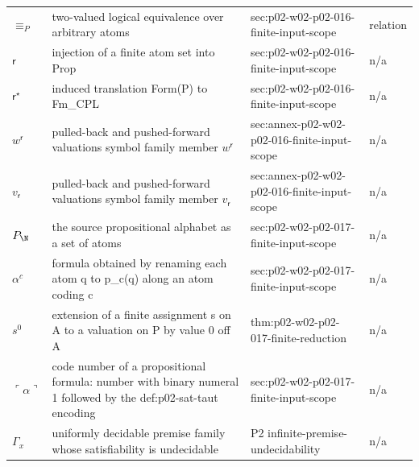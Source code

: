 \begin{longtable}{@{}p{}p{}p{}p{}@{}}
\(\equiv_P\) & two-valued logical equivalence over arbitrary atoms & sec:\allowbreak{}p02-\allowbreak{}w02-\allowbreak{}p02-\allowbreak{}016-\allowbreak{}finite-\allowbreak{}input-\allowbreak{}scope & relation \\
\(\mathsf r\) & injection of a finite atom set into Prop & sec:\allowbreak{}p02-\allowbreak{}w02-\allowbreak{}p02-\allowbreak{}016-\allowbreak{}finite-\allowbreak{}input-\allowbreak{}scope & n/a \\
\(\mathsf r^{\star}\) & induced translation Form(P) to Fm\_CPL & sec:\allowbreak{}p02-\allowbreak{}w02-\allowbreak{}p02-\allowbreak{}016-\allowbreak{}finite-\allowbreak{}input-\allowbreak{}scope & n/a \\
\(w^{\mathsf r}\) & pulled-back and pushed-forward valuations symbol family member \(w^{\mathsf r}\) & sec:\allowbreak{}annex-\allowbreak{}p02-\allowbreak{}w02-\allowbreak{}p02-\allowbreak{}016-\allowbreak{}finite-\allowbreak{}input-\allowbreak{}scope & n/a \\
\(v_{\mathsf r}\) & pulled-back and pushed-forward valuations symbol family member \(v_{\mathsf r}\) & sec:\allowbreak{}annex-\allowbreak{}p02-\allowbreak{}w02-\allowbreak{}p02-\allowbreak{}016-\allowbreak{}finite-\allowbreak{}input-\allowbreak{}scope & n/a \\
\(P_{\N}\) & the source propositional alphabet as a set of atoms & sec:\allowbreak{}p02-\allowbreak{}w02-\allowbreak{}p02-\allowbreak{}017-\allowbreak{}finite-\allowbreak{}input-\allowbreak{}scope & n/a \\
\(\alpha^{c}\) & formula obtained by renaming each atom q to p\_{c(q)} along an atom coding c & sec:\allowbreak{}p02-\allowbreak{}w02-\allowbreak{}p02-\allowbreak{}017-\allowbreak{}finite-\allowbreak{}input-\allowbreak{}scope & n/a \\
\(s^{0}\) & extension of a finite assignment s on A to a valuation on P by value 0 off A & thm:\allowbreak{}p02-\allowbreak{}w02-\allowbreak{}p02-\allowbreak{}017-\allowbreak{}finite-\allowbreak{}reduction & n/a \\
\(\ulcorner\alpha\urcorner\) & code number of a propositional formula: number with binary numeral 1 followed by the def:p02-sat-taut encoding & sec:\allowbreak{}p02-\allowbreak{}w02-\allowbreak{}p02-\allowbreak{}017-\allowbreak{}finite-\allowbreak{}input-\allowbreak{}scope & n/a \\
\(\Gamma_x\) & uniformly decidable premise family whose satisfiability is undecidable & P2 infinite-\allowbreak{}premise-\allowbreak{}undecidability & n/a \\

\end{longtable}
